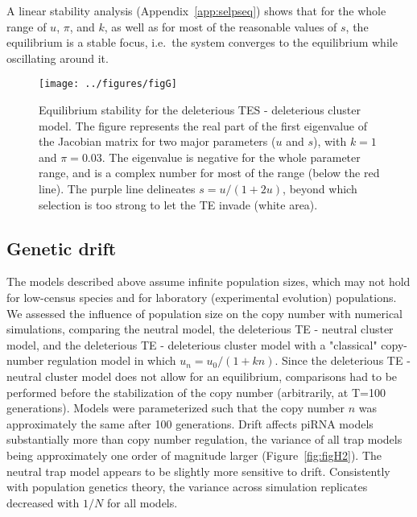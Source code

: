 \documentclass[10pt,a4paper]{article}
\begin{document}
A linear stability analysis (Appendix~\ref{app:selpseq}) shows that for the whole range of $u$, $\pi$, and $k$, as well as for most of the reasonable values of $s$, the equilibrium is a stable focus, i.e.\ the system converges to the equilibrium while oscillating around it. 

\begin{figure}
\begin{adjustwidth}{-1in}{0in}
\begin{center}
	\texttt{[image: ../figures/figG]}
\caption{\label{fig:figG} Equilibrium stability for the deleterious TES - deleterious cluster model. The figure represents the real part of the first eigenvalue of the Jacobian matrix for two major parameters ($u$ and $s$), with $k=1$ and $\pi = 0.03$. The eigenvalue is negative for the whole parameter range, and is a complex number for most of the range (below the red line). The purple line delineates $s = u/(1+2u)$, beyond which selection is too strong to let the TE invade (white area). }
\end{center}\end{adjustwidth}
\end{figure}

\subsection{Genetic drift}

The models described above assume infinite population sizes, which may not hold for low-census species and for laboratory (experimental evolution) populations. We assessed the influence of population size on the copy number with numerical simulations, comparing the neutral model, the deleterious TE - neutral cluster model, and the deleterious TE - deleterious cluster model with a "classical" copy-number regulation model in which $u_n = u_0/(1+kn)$. Since the deleterious TE - neutral cluster model does not allow for an equilibrium, comparisons had to be performed before the stabilization of the copy number (arbitrarily, at T=100 generations). Models were parameterized such that the copy number $n$ was approximately the same after 100 generations. Drift affects piRNA models substantially more than copy number regulation, the variance of all trap models being approximately one order of magnitude larger (Figure~\ref{fig:figH2}). The neutral trap model appears to be slightly more sensitive to drift. Consistently with population genetics theory, the variance across simulation replicates decreased with $1/N$ for all models. 
\end{document}
